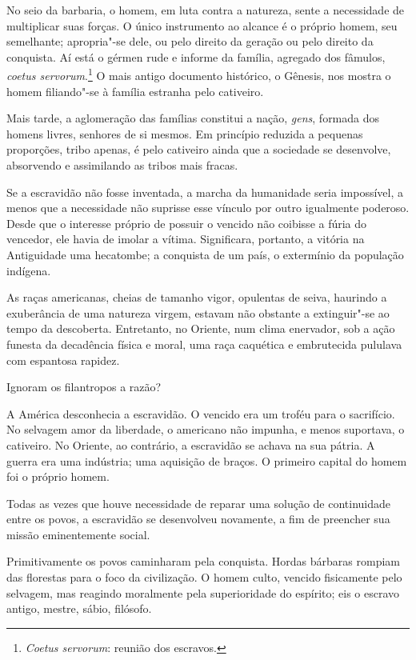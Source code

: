 \begin{linenumbers}

No seio da barbaria, o homem, em luta contra a natureza, sente a
necessidade de multiplicar suas forças. O único instrumento ao alcance
é o próprio homem, seu semelhante; apropria"-se dele, ou pelo direito	\label{barbaria}
da geração ou pelo direito da conquista. Aí está o gérmen rude e
informe da família, agregado dos fâmulos, \textit{coetus
servorum}.\footnote{ \textit{Coetus servorum}: reunião dos escravos.} 
O mais antigo documento histórico, o Gênesis, nos mostra o homem
filiando"-se à família estranha pelo cativeiro. 

Mais tarde, a aglomeração das famílias constitui a nação, \textit{gens},
formada dos homens livres, senhores de si mesmos. Em princípio reduzida
a pequenas proporções, tribo apenas, é pelo cativeiro ainda que a
sociedade se desenvolve, absorvendo e assimilando as tribos mais fracas.

Se a escravidão não fosse inventada, a marcha da humanidade seria
impossível, a menos que a necessidade não suprisse esse vínculo por
outro igualmente poderoso. Desde que o interesse próprio de possuir o
vencido não coibisse a fúria do vencedor, ele havia de imolar a vítima.
Significara, portanto, a vitória na Antiguidade uma hecatombe; a \label{hecatombe}
conquista de um país, o extermínio da população indígena. 

As raças americanas, cheias de tamanho vigor, opulentas de seiva,
haurindo a exuberância de uma natureza virgem, estavam não obstante a
extinguir"-se ao tempo da descoberta. Entretanto, no Oriente, num
clima enervador, sob a ação funesta da decadência física e moral, uma
raça caquética e embrutecida pululava com espantosa rapidez. 

Ignoram os filantropos a razão?

A América desconhecia a escravidão. O vencido era um troféu para o
sacrifício. No selvagem amor da liberdade, o americano não impunha, e
menos suportava, o cativeiro. No Oriente, ao contrário, a escravidão se
achava na sua pátria. A guerra era uma indústria; uma aquisição de
braços. O primeiro capital do homem foi o próprio homem.

Todas as vezes que houve necessidade de reparar uma solução de
continuidade entre os povos, a escravidão se desenvolveu novamente,
a fim de preencher sua missão eminentemente social. 

Primitivamente os povos caminharam pela conquista. Hordas bárbaras
rompiam das florestas para o foco da civilização. O homem culto,
vencido fisicamente pelo selvagem, mas reagindo moralmente pela
superioridade do espírito; eis o escravo antigo, mestre, sábio, filósofo. 


\end{linenumbers}
